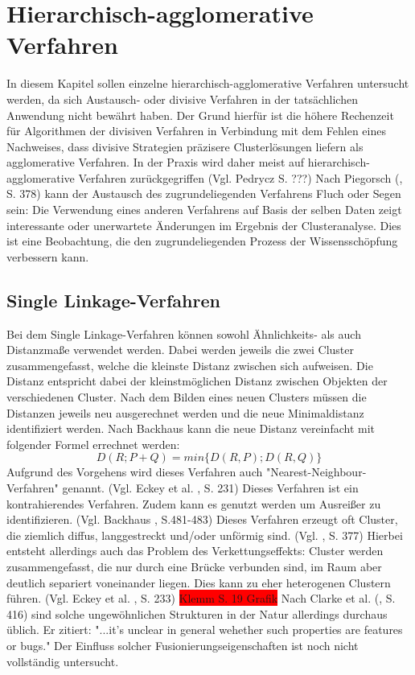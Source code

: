 \chapter{Hierarchisch-agglomerative Verfahren}

In diesem Kapitel sollen einzelne hierarchisch-agglomerative Verfahren untersucht werden, da sich Austausch- oder divisive Verfahren in der tatsächlichen Anwendung nicht bewährt haben. Der Grund hierfür ist die höhere Rechenzeit für Algorithmen der divisiven Verfahren in Verbindung mit dem Fehlen eines Nachweises, dass divisive Strategien präzisere Clusterlösungen liefern als agglomerative Verfahren. In der Praxis wird daher meist auf hierarchisch-agglomerative Verfahren zurückgegriffen (Vgl. Pedrycz \cite{Pedrycz.2010} S. ???)
Nach Piegorsch (\cite{Piegorsch.2015}, S. 378) kann der Austausch des zugrundeliegenden Verfahrens Fluch oder Segen sein: Die Verwendung eines anderen Verfahrens auf Basis der selben Daten zeigt interessante oder unerwartete Änderungen im Ergebnis der Clusteranalyse. Dies ist eine Beobachtung, die den zugrundeliegenden Prozess der Wissensschöpfung verbessern kann.

\section{Single Linkage-Verfahren}
Bei dem Single Linkage-Verfahren können sowohl Ähnlichkeits- als auch Distanzmaße verwendet werden. Dabei werden jeweils die zwei Cluster zusammengefasst, welche die kleinste Distanz zwischen sich aufweisen. Die Distanz entspricht dabei der kleinstmöglichen Distanz zwischen Objekten der verschiedenen Cluster. Nach dem Bilden eines neuen Clusters müssen die Distanzen jeweils neu ausgerechnet werden und die neue Minimaldistanz identifiziert werden.
Nach Backhaus \cite{Backhaus.2016} kann die neue Distanz vereinfacht mit folgender Formel errechnet werden:
\begin{equation}
	D(R;P+Q) = min\{D(R,P);D(R,Q)\}
\end{equation}
Aufgrund des Vorgehens wird dieses Verfahren auch "Nearest-Neighbour-Verfahren" genannt. (Vgl. Eckey et al. \cite{Eckey.2002}, S. 231)
Dieses Verfahren ist ein kontrahierendes Verfahren. Zudem kann es genutzt werden um Ausreißer zu identifizieren. (Vgl. Backhaus \cite{Backhaus.2016}, S.481-483)
Dieses Verfahren erzeugt oft Cluster, die ziemlich diffus, langgestreckt und/oder unförmig sind. (Vgl. \cite{Piegorsch.2015}, S. 377)
Hierbei entsteht allerdings auch das Problem des Verkettungseffekts: Cluster werden zusammengefasst, die nur durch eine Brücke verbunden sind, im Raum aber deutlich separiert voneinander liegen. Dies kann zu eher heterogenen Clustern führen. (Vgl. Eckey et al. \cite{Eckey.2002}, S. 233)  \colorbox{red}{Klemm S. 19 Grafik}
Nach Clarke et al. (\cite{Clarke.2009}, S. 416) sind solche ungewöhnlichen Strukturen in der Natur allerdings durchaus üblich. Er zitiert: "...it's unclear in general wehether such properties are features or bugs." Der Einfluss solcher Fusionierungseigenschaften ist noch nicht vollständig untersucht.


